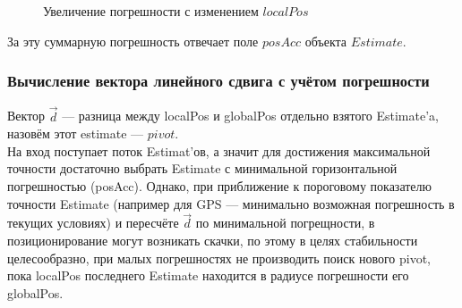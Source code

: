 \documentclass[a4paper, 11pt, titlepage]{article}
\begin{document}
          \begin{figure}[H]
            \centering
            \caption{Увеличение погрешности с изменением $localPos$}
          \end{figure}

          За эту суммарную погрешность отвечает поле $posAcc$ объекта $Estimate$.

        \subsubsection{Вычисление вектора линейного сдвига с учётом погрешности}
          Вектор $\vec{d}$ --- разница между localPos и globalPos отдельно взятого Estimate'a, назовём этот estimate --- $pivot$.\\
          На вход поступает поток Estimat'ов, а значит для достижения максимальной точности достаточно выбрать Estimate с минимальной 
          горизонтальной погрешностью (posAcc). Однако, при приближение к пороговому показателю точности Estimate (например для GPS --- минимально
          возможная погрешность в текущих условиях) и пересчёте $\vec{d}$ по минимальной погрещности, в позиционирование могут возникать скачки,
          по этому в целях стабильности целесообразно, при малых погрешностях не производить поиск нового pivot, пока localPos последнего
          Estimate находится в радиусе погрешности его globalPos.
\end{document}
